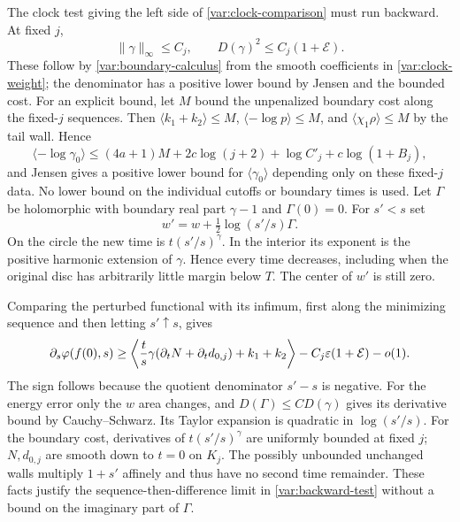 The clock test giving the left side of \eqref{var:clock-comparison}
must run backward.  At fixed $j$,
\[
 \|\gamma\|_\infty\le C_j,\qquad
 D(\gamma)^2\le C_j(1+\mathcal E).
\]
These follow by \eqref{var:boundary-calculus} from the smooth
coefficients in \eqref{var:clock-weight}; the denominator has a
positive lower bound by Jensen and the bounded cost.
For an explicit bound, let $M$ bound the unpenalized boundary cost
along the fixed-$j$ sequences.  Then
$\langle k_1+k_2\rangle\le M$,
$\langle-\log p\rangle\le M$, and
$\langle\chi_1\rho\rangle\le M$ by the tail wall.
Hence
\[
 \langle-\log\gamma_0\rangle
 \le (4a+1)M+2c\log(j+2)+\log C'_j+c\log(1+B_j),
\]
and Jensen gives a positive lower bound for
$\langle\gamma_0\rangle$ depending only on these fixed-$j$ data.
No lower bound on the individual cutoffs or boundary times is used.
Let $\Gamma$ be holomorphic with boundary real part $\gamma-1$ and
$\Gamma(0)=0$.  For $s'<s$ set
\[
 w'=w+\tfrac12\log(s'/s)\Gamma.
\]
On the circle the new time is $t(s'/s)^\gamma$.
In the interior its exponent is the positive harmonic extension of
$\gamma$.  Hence every time decreases, including when the original
disc has arbitrarily little margin below $T$.
The center of $w'$ is still zero.

Comparing the perturbed functional with its infimum, first along the
minimizing sequence and then letting $s'\uparrow s$, gives
\begin{equation}
 \partial_s\varphi(f(0),s)
 \ge\left\langle\frac ts\gamma(\partial_tN+\partial_t d_{0,j})
                       +k_1+k_2\right\rangle
       -C_j\varepsilon(1+\mathcal E)-o(1).
 \label{var:backward-test}
\end{equation}
The sign follows because the quotient denominator $s'-s$ is negative.
For the energy error only the $w$ area changes, and
$D(\Gamma)\le C D(\gamma)$ gives its derivative bound by
Cauchy--Schwarz.  Its Taylor expansion is quadratic in $\log(s'/s)$.
For the boundary cost, derivatives of $t(s'/s)^\gamma$ are uniformly
bounded at fixed $j$; $N,d_{0,j}$ are smooth down to $t=0$ on $K_j$.
The possibly unbounded unchanged walls multiply $1+s'$ affinely and
thus have no second time remainder.  These facts justify the
sequence-then-difference limit in \eqref{var:backward-test} without a
bound on the imaginary part of $\Gamma$.

